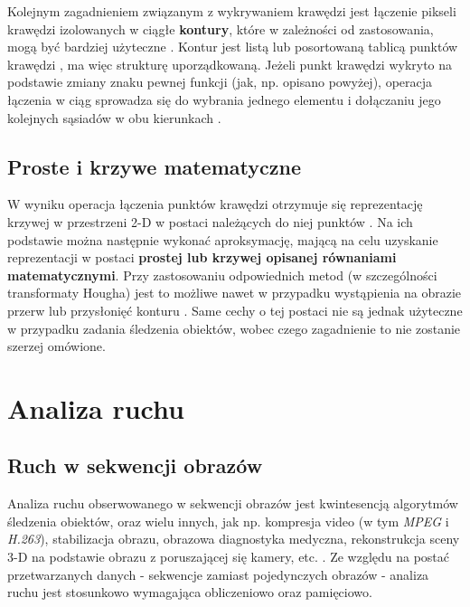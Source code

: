 Kolejnym zagadnieniem związanym z wykrywaniem krawędzi jest łączenie pikseli krawędzi izolowanych w ciągłe \textbf{kontury}, które w zależności od zastosowania, mogą być bardziej użyteczne \cite{Szeliski2011}. Kontur jest listą lub posortowaną tablicą punktów krawędzi \cite{Szeliski2011}, ma więc strukturę uporządkowaną. Jeżeli punkt krawędzi wykryto na podstawie zmiany znaku pewnej funkcji (jak, np. opisano powyżej), operacja łączenia w ciąg sprowadza się do wybrania jednego elementu i dołączaniu jego kolejnych sąsiadów w obu kierunkach \cite{Szeliski2011}.

\subsection{Proste i krzywe matematyczne}
\label{subsec:Proste_i_krzywe_matematyczne}
W wyniku operacja łączenia punktów krawędzi otrzymuje się reprezentację krzywej w przestrzeni 2-D w postaci należących do niej punktów \cite{Szeliski2011}. Na ich podstawie można następnie wykonać aproksymację, mającą na celu uzyskanie reprezentacji w postaci \textbf{prostej lub krzywej opisanej równaniami matematycznymi}. Przy zastosowaniu odpowiednich metod (w szczególności transformaty Hougha) jest to możliwe nawet w przypadku wystąpienia na obrazie przerw lub przysłonięć konturu \cite{Szeliski2011}. Same cechy o tej postaci nie są jednak użyteczne w przypadku zadania śledzenia obiektów, wobec czego zagadnienie to nie zostanie szerzej omówione.

\section{Analiza ruchu}
\label{sec:Analiza_ruchu}

\subsection{Ruch w sekwencji obrazów}
\label{subsec:Ruch_w_sekwencji_obrazow}
Analiza ruchu obserwowanego w sekwencji obrazów jest kwintesencją algorytmów śledzenia obiektów, oraz wielu innych, jak np. kompresja video (w tym \textit{MPEG} i \textit{H.263}), stabilizacja obrazu, obrazowa diagnostyka medyczna, rekonstrukcja sceny 3-D na podstawie obrazu z poruszającej się kamery, etc. \cite{Szeliski2011}. Ze względu na postać przetwarzanych danych - sekwencje zamiast pojedynczych obrazów - analiza ruchu jest stosunkowo wymagająca obliczeniowo oraz pamięciowo. 

